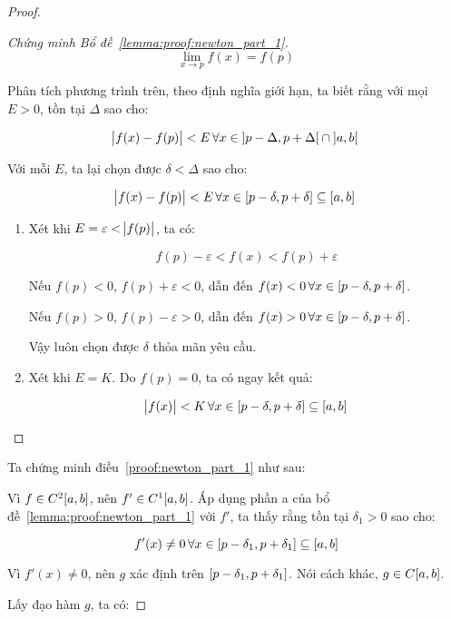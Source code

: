 \documentclass[../../Lectures]{subfiles}
\begin{document}
\begin{proof}
\begin{proof}[Chứng minh Bổ đề~\ref{lemma:proof:newton_part_1}]
        \[\lim_{x \to p} f(x) = f(p)\]

        Phân tích phương trình trên, theo định nghĩa giới hạn, ta biết rằng với
        mọi \(E > 0\), tồn tại \(\Delta\) sao cho:

        \[\abs{f(x) - f(p)} < E \, \forall x \in \interval[open]{p - \Delta}{p + \Delta} \cap \interval[open]{a}{b}\]

        Với mỗi \(E\), ta lại chọn được \(\delta < \Delta\) sao cho:

        \[\abs{f(x) - f(p)} < E \, \forall x \in \interval{p - \delta}{p + \delta} \subseteq \interval{a}{b}\]

        \begin{enumerate}[label = (\alph*)]
            \item Xét khi \(E = \varepsilon < \abs{f(p)}\), ta có:

                \[f(p) - \varepsilon < f(x) < f(p) + \varepsilon\]

                Nếu \(f(p) < 0\), \(f(p) + \varepsilon < 0\), dẫn đến \(f(x) < 0
                \, \forall x \in \interval{p - \delta}{p + \delta}\).

                Nếu \(f(p) > 0\), \(f(p) - \varepsilon > 0\), dẫn đến \(f(x) > 0
                \, \forall x \in \interval{p - \delta}{p + \delta}\).

                Vậy luôn chọn được \(\delta\) thỏa mãn yêu cầu.

            \item Xét khi \(E = K\). Do \(f(p) = 0\), ta có ngay kết quả:

                \[\abs{f(x)} < K \, \forall x \in \interval{p - \delta}{p + \delta} \subseteq \interval{a}{b}\]
        \end{enumerate}
    \end{proof}

    Ta chứng minh điều~\ref{proof:newton_part_1} như sau:

    Vì \(f \in C^2 \interval{a}{b}\), nên \(f' \in C^1 \interval{a}{b}\). Áp
    dụng phần a của bổ đề~\ref{lemma:proof:newton_part_1} với \(f'\), ta thấy
    rằng tồn tại \(\delta_1 > 0\) sao cho:

    \[f'(x) \neq 0 \, \forall x \in \interval{p - \delta_1}{p + \delta_1} \subseteq \interval{a}{b}\]

    Vì \(f'(x) \neq 0\), nên \(g\) xác định trên \(\interval{p - \delta_1}{p +
    \delta_1}\). Nói cách khác, \(g \in C \interval{a}{b}\).

    Lấy đạo hàm \(g\), ta có:


\end{proof}
\end{document}
